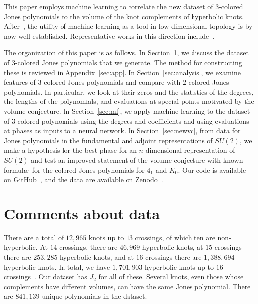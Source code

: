 \documentclass[11pt]{article}
\begin{document}
This paper employs machine learning to correlate the new dataset of $3$-colored Jones polynomials to the volume of the knot complements of hyperbolic knots.
After~\cite{hughes2016neural}, the utility of machine learning as a tool in low dimensional topology is by now well established.
Representative works in this direction include~\cite{Jejjala:2019kio,levitt2022big,Gukov:2020qaj,Craven:2020bdz,dlotko2023mappertypealgorithmscomplexdata,davies2021advancing,Craven:2021ckk,Craven:2022cxe,Gukov:2023kvx,Gukov:2024buj,Gukov:2024opc}.

The organization of this paper is as follows.
In Section~\ref{sec:data}, we discuss the dataset of $3$-colored Jones polynomials that we generate.
The method for constructing these is reviewed in Appendix~\ref{sec:app}.
In Section~\ref{sec:analysis}, we examine features of $3$-colored Jones polynomials and compare with $2$-colored Jones polynomials.
In particular, we look at their zeros and the statistics of the degrees, the lengths of the polynomials, and evaluations at special points motivated by the volume conjecture.
In Section~\ref{sec:ml}, we apply machine learning to the dataset of $3$-colored polynomials using the degrees and coefficients and using evaluations at phases as inputs to a neural network.
In Section~\ref{sec:newvc}, from data for Jones polynomials in the fundamental and adjoint representations of $SU(2)$, we make a hypothesis for the best phase for an $n$-dimensional representation of $SU(2)$ and test an improved statement of the volume conjecture with known formul\ae\ for the colored Jones polynomials for $4_1$ and $K_0$.
Our code is available on \href{https://github.com/roypratik92/ColoredJonesML}{GitHub}~\cite{github}, and the data are available on \href{https://doi.org/10.5281/zenodo.1490093}{Zenodo}~\cite{data}.

\section{Comments about data}\label{sec:data}

There are a total of $12{,} 965$ knots up to $13$ crossings, of which ten are non-hyperbolic.
At $14$ crossings, there are $46{,} 969$ hyperbolic knots, at $15$ crossings there are $253{,} 285$ hyperbolic knots, and at $16$ crossings there are $1{,} 388{,} 694$ hyperbolic knots.
In total, we have $1{,} 701{,} 903$ hyperbolic knots up to $16$ crossings~\cite{hoste1998first}.
Our dataset has $J_2$ for all of these.
Several knots, even those whose complements have different volumes, can have the same Jones polynomial.
There are $841{,} 139$ unique polynomials in the dataset.
\end{document}
